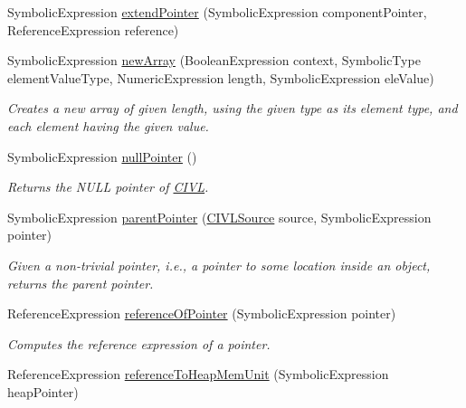 \begin{DoxyCompactItemize}
Symbolic\+Expression \hyperlink{interfaceedu_1_1udel_1_1cis_1_1vsl_1_1civl_1_1dynamic_1_1IF_1_1SymbolicUtility_ab97faf30b768b2266909d3d118197600}{extend\+Pointer} (Symbolic\+Expression component\+Pointer, Reference\+Expression reference)
\item 
Symbolic\+Expression \hyperlink{interfaceedu_1_1udel_1_1cis_1_1vsl_1_1civl_1_1dynamic_1_1IF_1_1SymbolicUtility_a47844f092c95502c126cae3611d3f991}{new\+Array} (Boolean\+Expression context, Symbolic\+Type element\+Value\+Type, Numeric\+Expression length, Symbolic\+Expression ele\+Value)
\begin{DoxyCompactList}\small\item\em Creates a new array of given length, using the given type as its element type, and each element having the given value. \end{DoxyCompactList}\item 
Symbolic\+Expression \hyperlink{interfaceedu_1_1udel_1_1cis_1_1vsl_1_1civl_1_1dynamic_1_1IF_1_1SymbolicUtility_ab932e22e41ff7e3f8dc2fa6c0cf0ed6b}{null\+Pointer} ()
\begin{DoxyCompactList}\small\item\em Returns the N\+U\+L\+L pointer of \hyperlink{classedu_1_1udel_1_1cis_1_1vsl_1_1civl_1_1CIVL}{C\+I\+V\+L}. \end{DoxyCompactList}\item 
Symbolic\+Expression \hyperlink{interfaceedu_1_1udel_1_1cis_1_1vsl_1_1civl_1_1dynamic_1_1IF_1_1SymbolicUtility_ad5d4021442518638e1b805ab4ff1bbac}{parent\+Pointer} (\hyperlink{interfaceedu_1_1udel_1_1cis_1_1vsl_1_1civl_1_1model_1_1IF_1_1CIVLSource}{C\+I\+V\+L\+Source} source, Symbolic\+Expression pointer)
\begin{DoxyCompactList}\small\item\em Given a non-\/trivial pointer, i.\+e., a pointer to some location inside an object, returns the parent pointer. \end{DoxyCompactList}\item 
Reference\+Expression \hyperlink{interfaceedu_1_1udel_1_1cis_1_1vsl_1_1civl_1_1dynamic_1_1IF_1_1SymbolicUtility_ac84eef033cd5150ec25d3fba4accb9f9}{reference\+Of\+Pointer} (Symbolic\+Expression pointer)
\begin{DoxyCompactList}\small\item\em Computes the reference expression of a pointer. \end{DoxyCompactList}\item 
Reference\+Expression \hyperlink{interfaceedu_1_1udel_1_1cis_1_1vsl_1_1civl_1_1dynamic_1_1IF_1_1SymbolicUtility_a85dff23f772e32aaf75fe4f1e79b08ca}{reference\+To\+Heap\+Mem\+Unit} (Symbolic\+Expression heap\+Pointer)

\end{DoxyCompactItemize}
